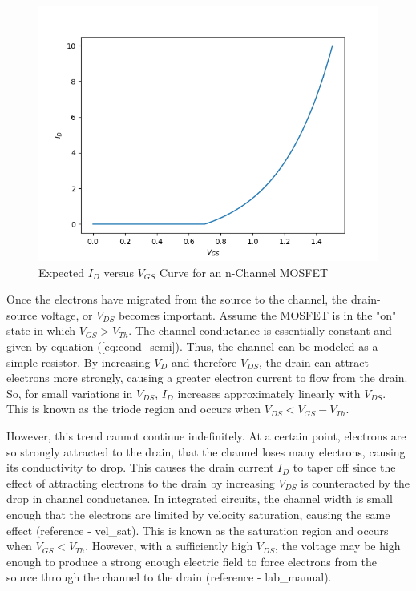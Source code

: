 \begin{figure}[h!]
	\centering
	\includegraphics[scale=0.75]{../images/id_vs_vgs.PNG}
	\caption{Expected $I_D$ versus $V_{GS}$ Curve for an n-Channel MOSFET}
	\label{fig:id_vs_vgs}
\end{figure}

\FloatBarrier

Once the electrons have migrated from the source to the channel, the drain-source voltage, or $V_{DS}$ becomes important. Assume the MOSFET is in the "on" state in which $V_{GS} > V_{Th}$. The channel conductance is essentially constant and given by equation (\ref{eq:cond_semi}). Thus, the channel can be modeled as a simple resistor. By increasing $V_{D}$ and therefore $V_{DS}$, the drain can attract electrons more strongly, causing a greater electron current to flow from the drain. So, for small variations in $V_{DS}$, $I_{D}$ increases approximately linearly with $V_{DS}$. This is known as the triode region and occurs when $V_{DS} < V_{GS} - V_{Th}$.

However, this trend cannot continue indefinitely. At a certain point, electrons are so strongly attracted to the drain, that the channel loses many electrons, causing its conductivity to drop. This causes the drain current $I_{D}$ to taper off since the effect of attracting electrons to the drain by increasing $V_{DS}$ is counteracted by the drop in channel conductance. In integrated circuits, the channel width is small enough that the electrons are limited by velocity saturation, causing the same effect (reference - vel\_sat). This is known as the saturation region and occurs when $V_{GS} < V_{Th}$. However, with a sufficiently high $V_{DS}$, the voltage may be high enough to produce a strong enough electric field to force electrons from the source through the channel to the drain (reference - lab\_manual).

